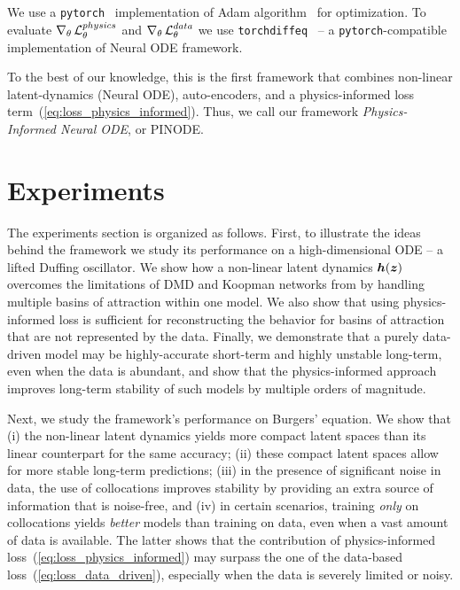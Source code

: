 We use a \texttt{pytorch}~\cite{NEURIPS2019_9015} implementation of Adam algorithm~\cite{kingma2014adam} for optimization. To evaluate $\nabla_\theta \operatorname{\mathcal{L}}^{physics}_\theta$ and $\nabla_\theta \operatorname{\mathcal{L}}^{data}_\theta$ we use \texttt{torchdiffeq}~\cite{chen2018neural} -- a \texttt{pytorch}-compatible implementation of Neural ODE framework. 

To the best of our knowledge, this is the first framework that combines non-linear latent-dynamics (Neural ODE), auto-encoders, and a physics-informed loss term~(\ref{eq:loss_physics_informed}). Thus, we call our framework \textit{Physics-Informed Neural ODE}, or PINODE. 

\section{Experiments}
\label{sec:exp}
The experiments section is organized as follows. First, to illustrate the ideas behind the framework we study its performance on a high-dimensional ODE -- a lifted Duffing oscillator. We show how a non-linear latent dynamics $\boldsymbol{h}(\boldsymbol{z})$ overcomes the limitations of DMD and Koopman networks from \cite{liu2022physics} by handling multiple basins of attraction within one model. We also show that using physics-informed loss is sufficient for reconstructing the behavior for basins of attraction that are not represented by the data. Finally, we demonstrate that a purely data-driven model may be highly-accurate short-term and highly unstable long-term, even when the data is abundant, and show that the physics-informed approach improves long-term stability of such models by multiple orders of magnitude.

Next, we study the framework's performance on Burgers' equation. We show that (i) the non-linear latent dynamics yields more compact latent spaces than its linear counterpart for the same accuracy; (ii) these compact latent spaces allow for more stable long-term predictions; (iii) in the presence of significant noise in data, the use of collocations improves stability by providing an extra source of information that is noise-free, and (iv) in certain scenarios, training \textit{only} on collocations yields \textit{better} models than training on data, even when a vast amount of data is available. The latter shows that the contribution of physics-informed loss~(\ref{eq:loss_physics_informed}) may surpass the one of the data-based loss~(\ref{eq:loss_data_driven}), especially when the data is severely limited or noisy. 

